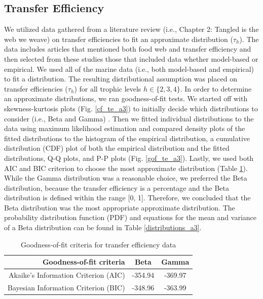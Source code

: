 \documentclass[oneside,12pt,final]{sty/ucthesis-CA2012}
\let\cite\citep                             %
\begin{document}
\begin{mainmatter}
\subsection{Transfer Efficiency}
We utilized data gathered from a literature review (i.e., Chapter 2: Tangled is the web we weave) on transfer efficiencies to fit an approximate distribution ($\tau_h$). The data includes articles that mentioned both food web and transfer efficiency and then selected from these studies those that included data whether model-based or empirical. We used all of the marine data (i.e., both model-based and empirical) to fit a distribution. The resulting distributional assumption was placed on transfer efficiencies ($\tau_h$) for all trophic levels $h \in \{2, 3, 4\}$. In order to determine an approximate distributions, we ran goodness-of-fit tests. We started off with skewness-kurtosis plots (Fig. \ref{cf_te_a3}) to initially decide which distributions to consider (i.e., Beta and Gamma) \cite{fitdistrplus}. Then we fitted individual distributions to the data using maximum likelihood estimation and compared density plots of the fitted distributions to the histogram of the empirical distribution, a cumulative distribution (CDF) plot of both the empirical distribution and the fitted distributions, Q-Q plots, and P-P plots (Fig. \ref{gof_te_a3}). Lastly, we used both AIC and BIC criterion to choose the most approximate distribution (Table \ref{te_aic_a3}). While the Gamma distribution was a reasonable choice, we preferred the Beta distribution, because the transfer efficiency is a percentage and the Beta distribution is defined within the range [0, 1]. Therefore, we concluded that the Beta distribution was the most appropriate approximate distribution. The probability distribution function (PDF) and equations for the mean and variance of a Beta distribution can be found in Table \ref{distributions_a3}.

\begin{table}[H]
\centering
\caption{Goodness-of-fit criteria for transfer efficiency data}
\begin{tabular}{r|c|c}
  \hline \small
 Goodness-of-fit criteria & Beta  & Gamma \\ 
   \hline
   Akaike's Information Criterion (AIC) & -354.94 & -369.97 \\   
   Bayesian Information Criterion (BIC) & -348.96 &  -363.99  \\
   \hline
\end{tabular} 
\label{te_aic_a3}
\end{table}


\end{mainmatter}
\end{document}
